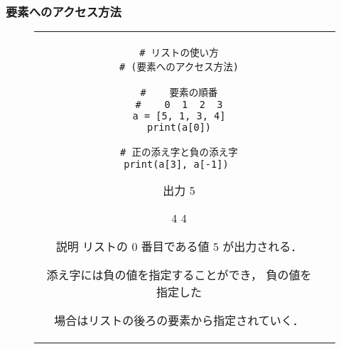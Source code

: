 \documentclass{jsarticle}
\begin{document}
\subsubsection{要素へのアクセス方法} \vspace{-5mm}
\begin{figure}[h]
	\begin{tabular}{cc}
		\begin{minipage}[t]{.4\textwidth}
			\begin{lstlisting}[caption=要素へのアクセス方法]
# リストの使い方
# (要素へのアクセス方法)

#    要素の順番
#    0  1  2  3
a = [5, 1, 3, 4]
print(a[0])

# 正の添え字と負の添え字
print(a[3], a[-1]) \end{lstlisting}
		\end{minipage} \hspace{5mm}
		\begin{minipage}[t]{.6\textwidth}
			\begin{minipage}[t]{.3\textwidth}
				\begin{itembox}[l]{出力}
					5 \par
					4 4 \par
				\end{itembox}
			\end{minipage}
			\begin{itembox}[l]{説明}
				リストの 0 番目である値 5 が出力される． \par
				添え字には負の値を指定することができ， 負の値を
				指定した\par 場合はリストの後ろの要素から指定されていく． \par
			\end{itembox}
		\end{minipage}
	\end{tabular}
\end{figure}
\end{document}
